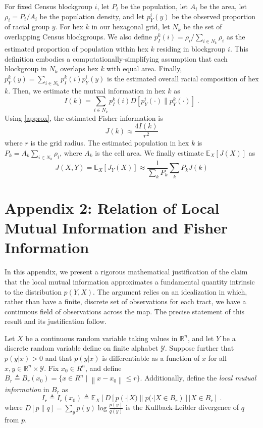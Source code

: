 \documentclass[english]{scrartcl}
\newcommand\E[0]{\mathbb{E}}
\newcommand\R[0]{\mathbb{R}}
\newcommand{\norm}[1]{\left\lVert#1\right\rVert}
\begin{document}
	For fixed Census blockgroup $i$, let $P_i$ be the population, let $A_i$ be the area, let $\rho_i = P_i / A_i$ be the population density, and let $p^i_Y(y)$ be the observed proportion of racial group $y$. For hex $k$ in our hexagonal grid, let $N_k$ be the set of overlapping Census blockgroups. We also define $p^{k}_I(i) = \rho_i / \sum_{i \in N_k} \rho_i$ as the estimated proportion of population within hex $k$ residing in blockgroup $i$. This definition embodies a computationally-simplifying assumption that each blockgroup in $N_k$ overlaps hex $k$ with equal area. Finally, $p^k_Y(y) = \sum_{i \in N_k} p^{k}_I(i) p^i_Y(y)$ is the estimated overall racial composition of hex $k$. Then, we estimate the mutual information in hex $k$ as 
	\begin{equation}
		I(k) = \sum_{i \in N_k} p^k_I(i) D[p^i_Y(\cdot) \| p^k_Y(\cdot)]\;. 
	\end{equation}
	Using \eqref{approx}, the estimated Fisher information is 
	\begin{equation}
		J(k) \approx \frac{4 I(k)}{r^2}
	\end{equation}
	where $r$ is the grid radius. The estimated population in hex $k$ is $P_k = A_k\sum_{i \in N_k} \rho_i$, where $A_k$ is the cell area. We finally estimate $\E_X[J(X)]$ as 
	\begin{equation}
		J(X,Y) = \E_X[J_Y(X)] \approx \frac{1}{\sum_k P_k} \sum_k P_k J(k)
	\end{equation}
\section*{Appendix 2: Relation of Local Mutual Information and Fisher Information}
	In this appendix, we present a rigorous mathematical justification of the claim that the local mutual information approximates a fundamental quantity intrinsic to the distribution $p(Y,X)$. The argument relies on an idealization in which, rather than have a finite, discrete set of observations for each tract, we have a continuous field of observations across the map. The precise statement of this result and its justification follow. 


	Let $X$ be a continuous random variable taking values in $\R^n$, and let $Y$ be a discrete random variable define on finite alphabet $\mathcal{Y}$. Suppose further that $p(y|x) > 0$ and that $p(y|x)$ is differentiable as a function of $x$ for all $x,y \in \R^n \times \mathcal{Y}$. Fix $x_0 \in R^n$, and define $B_r \triangleq B_r(x_0) = \{ x \in R^n \;|\; \norm{x - x_0} \leq r \}$. Additionally, define the \emph{local mutual information} in $B_r$ as
	\begin{equation}
		I_r \triangleq I_r(x_0) \triangleq \E_X[D[p(\cdot|X)\| p(\cdot|X \in B_r)]|X \in B_r]\;.
	\end{equation}
	where $D[p\|q] = \sum_{y} p(y) \log \frac{p(y)}{q(y)}$ is the Kullback-Leibler divergence of $q$ from $p$. 
\end{document}
